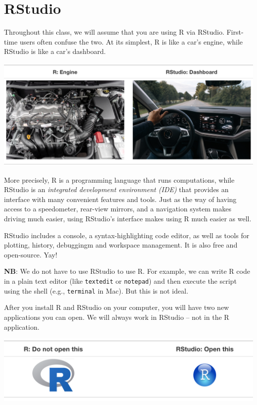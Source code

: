 \documentclass[]{book}
\begin{document}
\hypertarget{rstudio-1}{\section{RStudio}\label{rstudio-1}}

Throughout this class, we will assume that you are using R via RStudio.
First-time users often confuse the two. At its simplest, R is like a
car's engine, while RStudio is like a car's dashboard.

\begin{center}\includegraphics[width=0.7\linewidth]{img/R_vs_RStudio_1} \end{center}

More precisely, R is a programming language that runs computations,
while RStudio is an \emph{integrated development environment (IDE)} that
provides an interface with many convenient features and tools. Just as
the way of having access to a speedometer, rear-view mirrors, and a
navigation system makes driving much easier, using RStudio's interface
makes using R much easier as well.

RStudio includes a console, a syntax-highlighting code editor, as well
as tools for plotting, history, debuggingm and workspace management. It
is also free and open-source. Yay!

\textbf{NB}: We do not have to use RStudio to use R. For example, we can
write R code in a plain text editor (like \texttt{textedit} or
\texttt{notepad}) and then execute the script using the shell (e.g.,
\texttt{terminal} in Mac). But this is not ideal.

After you install R and RStudio on your computer, you will have two new
applications you can open. We will always work in RStudio -- not in the
R application.

\begin{center}\includegraphics[width=0.7\linewidth]{img/R_vs_RStudio} \end{center}
\end{document}
